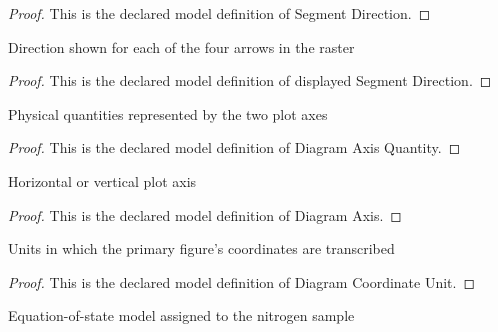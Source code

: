 \begin{proof}
  This is the declared model definition of Segment Direction.
\end{proof}
\begin{definition}
  \label{def:physics:phyx-mini-0368:phyxminiproblems-problemphyxmini0368-displayedsegmentdirection}
  Direction shown for each of the four arrows in the raster
\end{definition}
\begin{proof}
  This is the declared model definition of displayed Segment Direction.
\end{proof}
\begin{definition}
  \label{def:physics:phyx-mini-0368:phyxminiproblems-problemphyxmini0368-diagramaxisquantity}
  Physical quantities represented by the two plot axes
\end{definition}
\begin{proof}
  This is the declared model definition of Diagram Axis Quantity.
\end{proof}
\begin{definition}
  \label{def:physics:phyx-mini-0368:phyxminiproblems-problemphyxmini0368-diagramaxis}
  Horizontal or vertical plot axis
\end{definition}
\begin{proof}
  This is the declared model definition of Diagram Axis.
\end{proof}
\begin{definition}
  \label{def:physics:phyx-mini-0368:phyxminiproblems-problemphyxmini0368-diagramcoordinateunit}
  Units in which the primary figure's coordinates are transcribed
\end{definition}
\begin{proof}
  This is the declared model definition of Diagram Coordinate Unit.
\end{proof}
\begin{definition}
  \label{def:physics:phyx-mini-0368:phyxminiproblems-problemphyxmini0368-gasmodel}
  Equation-of-state model assigned to the nitrogen sample
\end{definition}
